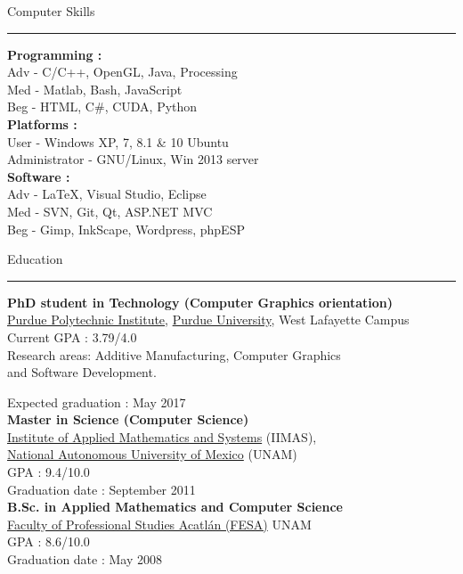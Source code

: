 \documentclass[letterpaper,10pt]{article}
\begin{document}
\begin{minipage}{0.40\textwidth}
\vspace*{-0.5cm}
 {\large{Computer Skills}} \\
 \textcolor{Dandelion}{\rule{0.5\textwidth}{0.05in}} 

\textbf{Programming :} \\
Adv - C/C++, OpenGL, Java, Processing \\
Med - Matlab, Bash, JavaScript \\
Beg - HTML, C\#, CUDA, Python\\

\textbf{Platforms :} \\
User - Windows XP, 7, 8.1 \& 10 Ubuntu \\
Administrator - GNU/Linux, Win 2013 server\\

\textbf{Software :} \\
Adv - \LaTeX, Visual Studio, Eclipse \\
Med - SVN, Git, Qt, ASP.NET MVC \\
Beg - Gimp, InkScape,  Wordpress, phpESP\\
\end{minipage}
%
\hspace{0.025\textwidth}
%
\begin{minipage}{0.70\textwidth} 
\vspace*{1.0cm}
{\centering \large{{Education}}} \\
\textcolor{Dandelion}{\rule{0.4\textwidth}{0.05in}}

\textbf{PhD student in Technology (Computer Graphics orientation)} \\
\href{http://polytechnic.purdue.edu/}{Purdue Polytechnic Institute}, \href{http://www.purdue.edu/}{Purdue University}, West Lafayette Campus \\
Current GPA : 3.79/4.0 \\
Research areas: Additive Manufacturing, Computer Graphics \\and Software Development.

Expected graduation : May 2017 \\

\textbf{Master in Science (Computer Science)} \\
\href{http://www.iimas.unam.mx/}{Institute of Applied Mathematics and Systems} (IIMAS), \\ \href{http://www.unam.mx/}{National Autonomous University of Mexico} (UNAM) \\
GPA : 9.4/10.0 \\
Graduation date : September 2011 \\

\textbf{B.Sc. in Applied Mathematics and Computer Science} \\
\href{http://www.acatlan.unam.mx/}{Faculty of Professional Studies Acatl\'{a}n (FESA)} UNAM \\
GPA : 8.6/10.0 \\
Graduation date : May 2008\\
\end{minipage} 
\end{document}
